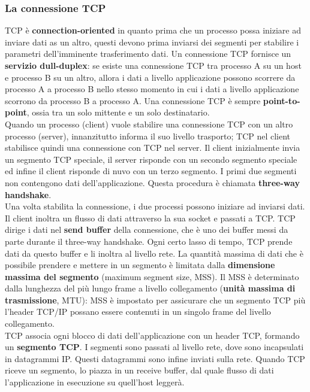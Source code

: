 \documentclass[11pt]{article}
\begin{document}
\subsubsection{La connessione TCP}
TCP è \textbf{connection-oriented} in quanto prima che un processo possa iniziare ad inviare dati as un altro, questi 
devono prima inviarsi dei segmenti per stabilire i parametri dell'imminente trasferimento dati.
Un connessione TCP fornisce un \textbf{servizio dull-duplex}: se esiste una connessione TCP tra processo A su un host e 
processo B su un altro, allora i dati a livello applicazione possono scorrere da processo A a processo B nello stesso 
momento in cui i dati a livello applicazione scorrono da processo B a processo A.
Una connessione TCP è sempre \textbf{point-to-point}, ossia tra un solo mittente e un solo destinatario.\\
Quando un processo (client) vuole stabilire una connessione TCP con un altro processo (server), innanzitutto informa il 
suo livello trasporto; TCP nel client stabilisce quindi una connessione con TCP nel server. Il client inizialmente invia 
un segmento TCP speciale, il server risponde con un secondo segmento speciale ed infine il client risponde di nuvo con 
un terzo segmento. I primi due segmenti non contengono dati dell'applicazione. Questa procedura è chiamata 
\textbf{three-way handshake}.\\
Una volta stabilita la connessione, i due processi possono iniziare ad inviarsi dati. Il client inoltra un flusso di 
dati attraverso la sua socket e passati a TCP. TCP dirige i dati nel \textbf{send buffer} della connessione, che è uno 
dei buffer messi da parte durante il three-way handshake. Ogni certo lasso di tempo, TCP prende dati da questo buffer e 
li inoltra al livello rete. La quantità massima di dati che è possibile prendere e mettere in un segmento è limitata 
dalla \textbf{dimensione massima del segmento} (maximum segment size, MSS). Il MSS è determinato dalla lunghezza del 
più lungo frame a livello collegamento (\textbf{unità massima di trasmissione}, MTU): MSS è impostato per assicurare che 
un segmento TCP più l'header TCP/IP possano essere contenuti in un singolo frame del livello collegamento. \\
TCP associa ogni blocco di dati dell'applicazione con un header TCP, formando un \textbf{segmento TCP}. I segmenti sono 
passati al livello rete, dove sono incapsulati in datagrammi IP. Questi datagrammi sono infine inviati sulla rete.
Quando TCP riceve un segmento, lo piazza in un receive buffer, dal quale flusso di dati l'applicazione in esecuzione su 
quell'host leggerà.
\end{document}
